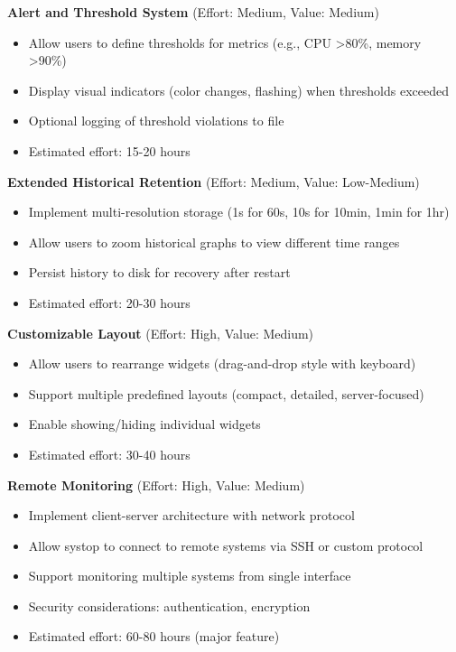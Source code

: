 \documentclass[12pt,a4paper,oneside]{report}
\begin{document}
\textbf{Alert and Threshold System} (Effort: Medium, Value: Medium)
\begin{itemize}
    \item Allow users to define thresholds for metrics (e.g., CPU >80\%, memory >90\%)
    \item Display visual indicators (color changes, flashing) when thresholds exceeded
    \item Optional logging of threshold violations to file
    \item Estimated effort: 15-20 hours
\end{itemize}

\textbf{Extended Historical Retention} (Effort: Medium, Value: Low-Medium)
\begin{itemize}
    \item Implement multi-resolution storage (1s for 60s, 10s for 10min, 1min for 1hr)
    \item Allow users to zoom historical graphs to view different time ranges
    \item Persist history to disk for recovery after restart
    \item Estimated effort: 20-30 hours
\end{itemize}

\textbf{Customizable Layout} (Effort: High, Value: Medium)
\begin{itemize}
    \item Allow users to rearrange widgets (drag-and-drop style with keyboard)
    \item Support multiple predefined layouts (compact, detailed, server-focused)
    \item Enable showing/hiding individual widgets
    \item Estimated effort: 30-40 hours
\end{itemize}

\textbf{Remote Monitoring} (Effort: High, Value: Medium)
\begin{itemize}
    \item Implement client-server architecture with network protocol
    \item Allow systop to connect to remote systems via SSH or custom protocol
    \item Support monitoring multiple systems from single interface
    \item Security considerations: authentication, encryption
    \item Estimated effort: 60-80 hours (major feature)
\end{itemize}
\end{document}
